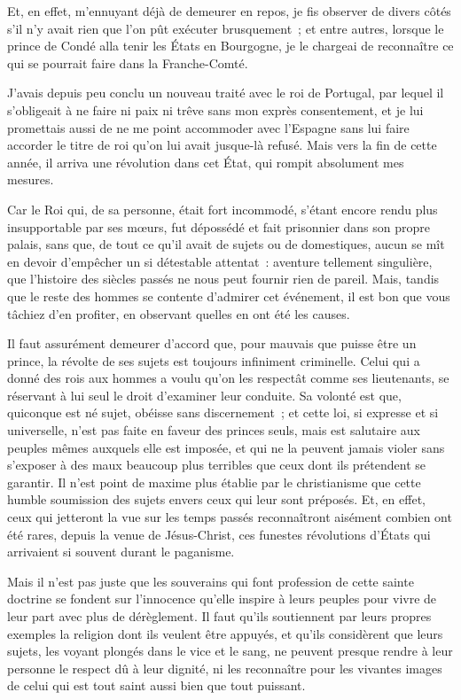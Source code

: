 \documentclass[french,twoside]{book} %
\begin{document}
Et, en effet, m’ennuyant déjà de demeurer en repos, je fis observer de divers côtés s’il n’y avait rien que l’on pût exécuter brusquement ; et entre autres, lorsque le prince de Condé alla tenir les États en Bourgogne, je le chargeai de reconnaître ce qui se pourrait faire dans la Franche-Comté.\par
J’avais depuis peu conclu un nouveau traité avec le roi de Portugal, par lequel il s’obligeait à ne faire ni paix ni trêve sans mon exprès consentement, et je lui promettais aussi de ne me point accommoder avec l’Espagne sans lui faire accorder le titre de roi qu’on lui avait jusque-là refusé. Mais vers la fin de cette année, il arriva une révolution dans cet État, qui rompit absolument mes mesures.\par
Car le Roi qui, de sa personne, était fort incommodé, s’étant encore rendu plus insupportable par ses mœurs, fut dépossédé et fait prisonnier dans son propre palais, sans que, de tout ce qu’il avait de sujets ou de domestiques, aucun se mît en devoir d’empêcher un si détestable attentat : aventure tellement singulière, que l’histoire des siècles passés ne nous peut fournir rien de pareil. Mais, tandis que le reste des hommes se contente d’admirer cet événement, il est bon que vous tâchiez d’en profiter, en observant quelles en ont été les causes.\par
Il faut assurément demeurer d’accord que, pour mauvais que puisse être un prince, la révolte de ses sujets est toujours infiniment criminelle. Celui qui a donné des rois aux hommes a voulu qu’on les respectât comme ses lieutenants, se réservant à lui seul le droit d’examiner leur conduite. Sa volonté est que, quiconque est né sujet, obéisse sans discernement ; et cette loi, si expresse et si universelle, n’est pas faite en faveur des princes seuls, mais est salutaire aux peuples mêmes auxquels elle est imposée, et qui ne la peuvent jamais violer sans s’exposer à des maux beaucoup plus terribles que ceux dont ils prétendent se garantir. Il n’est point de maxime plus établie par le christianisme que cette humble soumission des sujets envers ceux qui leur sont préposés. Et, en effet, ceux qui jetteront la vue sur les temps passés reconnaîtront aisément combien ont été rares, depuis la venue de Jésus-Christ, ces funestes révolutions d’États qui arrivaient si souvent durant le paganisme.\par
Mais il n’est pas juste que les souverains qui font profession de cette sainte doctrine se fondent sur l’innocence qu’elle inspire à leurs peuples pour vivre de leur part avec plus de dérèglement. Il faut qu’ils soutiennent par leurs propres exemples la religion dont ils veulent être appuyés, et qu’ils considèrent que leurs sujets, les voyant plongés dans le vice et le sang, ne peuvent presque rendre à leur personne le respect dû à leur dignité, ni les reconnaître pour les vivantes images de celui qui est tout saint aussi bien que tout puissant.\par
\end{document}
